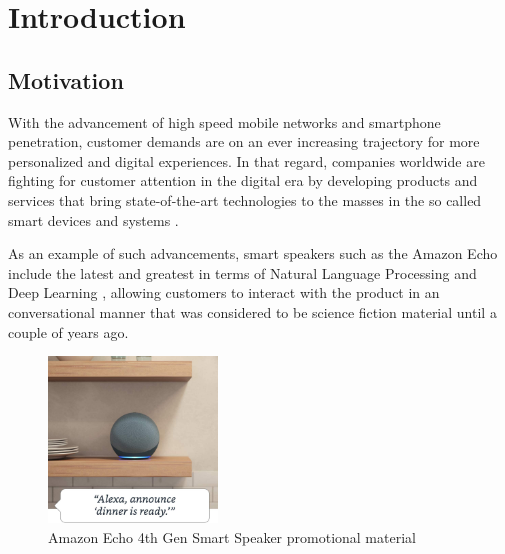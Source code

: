 \documentclass[openright]{normas-utf-tex} %
\begin{document}
\listadefiguras %
\listadetabelas %
\listadesiglas %
\listadesimbolos %

\sumario %
%
%
%
%

\setcounter{page}{12}

\chapter{Introduction}

\section{Motivation}

With the advancement of high speed mobile networks and smartphone penetration,
customer demands are on an ever increasing trajectory for more personalized and
digital experiences. In that regard, companies worldwide are fighting for
customer attention in the digital era by developing products and services that
bring state-of-the-art technologies to the masses in the so called smart
devices and systems \cite{Shafique2020}.

As an example of such advancements, smart speakers such as the Amazon Echo
\cite{GaoPanWangChen2018} include the latest and greatest in terms of Natural
Language Processing and Deep Learning \cite{Young2018}, allowing customers to
interact with the product in an conversational manner that was considered to be
science fiction material until a couple of years ago.

\begin{figure}[!htb]
	\centering
	\includegraphics[width=0.4\textwidth]{./images/echodot4.jpg} %
	\caption[Amazon Echo 4th Generation smart speaker promotional material]{Amazon Echo 4th Gen Smart Speaker promotional material}
	\label{fig:echodot4}
\end{figure}
\end{document}
